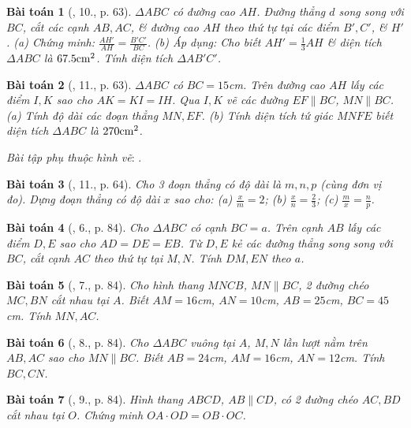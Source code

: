 \documentclass{article}
\newtheorem{baitoan}{Bài toán}
\begin{document}
\begin{baitoan}[\cite{SGK_Toan_8_tap_2}, 10., p. 63]
	$\Delta ABC$ có đường cao $AH$. Đường thẳng $d$ song song với $BC$, cắt các cạnh $AB,AC$, \& đường cao $AH$ theo thứ tự tại các điểm $B',C'$, \& $H'$. (a) Chứng minh: $\frac{AH'}{AH} = \frac{B'C'}{BC}$. (b) Áp dụng: Cho biết $AH' = \frac{1}{3}AH$ \& diện tích $\Delta ABC$ là $67.5{\rm cm}^2$. Tính diện tích $\Delta AB'C'$.
\end{baitoan}

\begin{baitoan}[\cite{SGK_Toan_8_tap_2}, 11., p. 63]
	$\Delta ABC$ có $BC = 15$\emph{cm}. Trên đường cao $AH$ lấy các điểm $I,K$ sao cho $AK = KI = IH$. Qua $I,K$ vẽ các đường $EF\parallel BC$, $MN\parallel BC$. (a) Tính độ dài các đoạn thẳng $MN,EF$. (b) Tính diện tích tứ giác $MNFE$ biết diện tích $\Delta ABC$ là $270{\rm cm}^2$.
\end{baitoan}
\noindent\textit{Bài tập phụ thuộc hình vẽ}: \cite[12.--13., p. 64]{SGK_Toan_8_tap_2}.

\begin{baitoan}[\cite{SGK_Toan_8_tap_2}, 11., p. 64]
	Cho 3 đoạn thẳng có độ dài là $m,n,p$ (cùng đơn vị đo). Dựng đoạn thẳng có độ dài $x$ sao cho: (a) $\frac{x}{m} = 2$; (b) $\frac{x}{n} = \frac{2}{3}$; (c) $\frac{m}{x} = \frac{n}{p}$.
\end{baitoan}

\begin{baitoan}[\cite{SBT_Toan_8_tap_2}, 6., p. 84]
	Cho $\Delta ABC$ có cạnh $BC = a$. Trên cạnh $AB$ lấy các điểm $D,E$ sao cho $AD = DE = EB$. Từ $D,E$ kẻ các đường thẳng song song với $BC$, cắt cạnh $AC$ theo thứ tự tại $M,N$. Tính $DM,EN$ theo $a$.	
\end{baitoan}

\begin{baitoan}[\cite{SBT_Toan_8_tap_2}, 7., p. 84]
	Cho hình thang $MNCB$, $MN\parallel BC$, 2 đường chéo $MC,BN$ cắt nhau tại $A$. Biết $AM = 16$\emph{cm}, $AN = 10$\emph{cm}, $AB = 25$\emph{cm}, $BC = 45$\emph{cm}. Tính $MN,AC$.
\end{baitoan}

\begin{baitoan}[\cite{SBT_Toan_8_tap_2}, 8., p. 84]
	Cho $\Delta ABC$ vuông tại $A$, $M,N$ lần lượt nằm trên $AB,AC$ sao cho $MN\parallel BC$. Biết $AB = 24$\emph{cm}, $AM = 16$\emph{cm}, $AN = 12$\emph{cm}. Tính $BC,CN$.
\end{baitoan}

\begin{baitoan}[\cite{SBT_Toan_8_tap_2}, 9., p. 84]
	Hình thang $ABCD$, $AB\parallel CD$, có 2 đường chéo $AC,BD$ cắt nhau tại $O$. Chứng minh $OA\cdot OD = OB\cdot OC$.
\end{baitoan}
\end{document}
